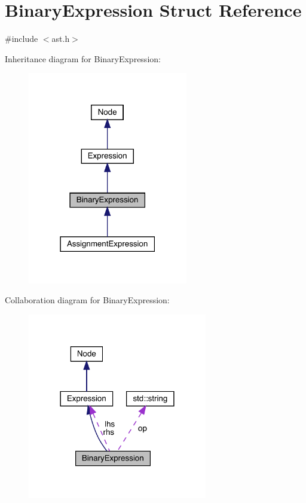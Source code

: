 \hypertarget{struct_binary_expression}{}\section{Binary\+Expression Struct Reference}
\label{struct_binary_expression}


{\ttfamily \#include $<$ast.\+h$>$}



Inheritance diagram for Binary\+Expression\+:
\nopagebreak
\begin{figure}[H]
\begin{center}
\leavevmode
\includegraphics[width=198pt]{struct_binary_expression__inherit__graph}
\end{center}
\end{figure}


Collaboration diagram for Binary\+Expression\+:
\nopagebreak
\begin{figure}[H]
\begin{center}
\leavevmode
\includegraphics[width=222pt]{struct_binary_expression__coll__graph}
\end{center}
\end{figure}
